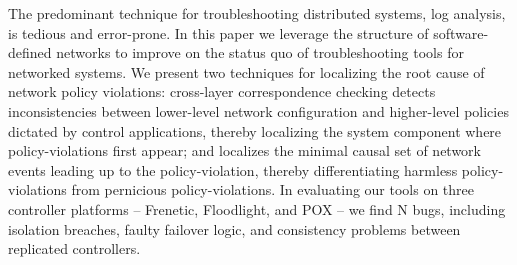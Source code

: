 The predominant technique for troubleshooting distributed systems,
log analysis, is tedious and error-prone. In this paper we leverage the
structure of software-defined networks to
improve on the status quo of troubleshooting tools for networked systems.
We present two techniques for localizing the root cause of network policy
violations: cross-layer correspondence checking detects inconsistencies between lower-level
network configuration and higher-level policies dictated by control
applications, thereby localizing the system component where policy-violations first
appear; and \simulator{} localizes the minimal causal set of network events
leading up to the policy-violation, thereby differentiating harmless
policy-violations from pernicious policy-violations. In evaluating our tools on
three controller platforms -- Frenetic, Floodlight, and POX -- we find N bugs,
including isolation breaches,
faulty failover logic, and consistency problems between replicated
controllers.

